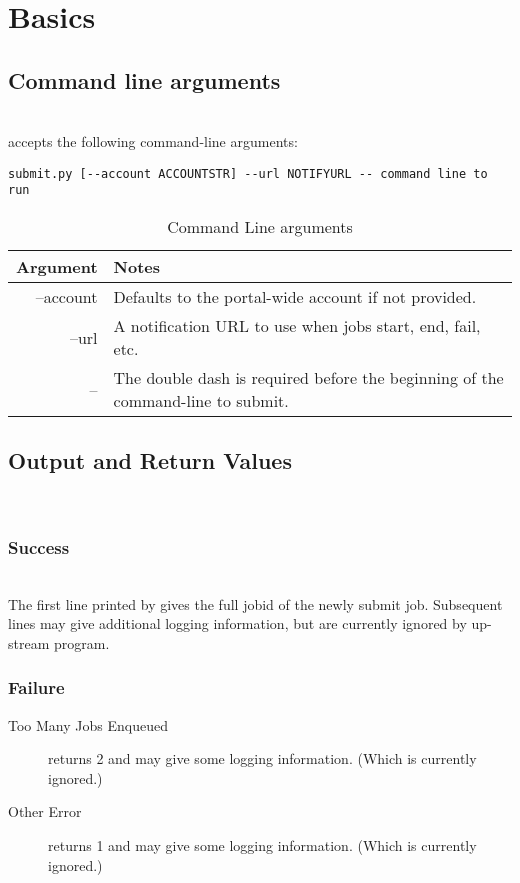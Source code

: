 \section{Basics}

\subsection{Command line arguments} \hfill \\
\theprog accepts the following command-line arguments:

\begin{verbatim}
submit.py [--account ACCOUNTSTR] --url NOTIFYURL -- command line to run
\end{verbatim}

\begin{longtable}{|r||p{ } | }
\caption{Command Line arguments}\\
\hline
{\bf Argument} & {\bf Notes}\\
\hline
--account & Defaults to the portal-wide account if not provided. \\
--url & A notification URL to use when jobs start, end, fail, etc.\\
-- & The double dash is required before the beginning of the command-line to submit.\\
\hline 
\end{longtable}

\subsection{Output and Return Values} \hfill \\

\subsubsection{Success} \hfill \\
The first line printed by \theprog gives the full jobid of the newly submit job.
Subsequent lines may give additional logging information, but are currently ignored by up-stream program.

\subsubsection{Failure}
\begin{description}
	\item[Too Many Jobs Enqueued]\theprog returns 2 and may give some logging information. (Which is currently ignored.)
	\item[Other Error] \theprog returns 1 and may give some logging information. (Which is currently ignored.)
\end{description}